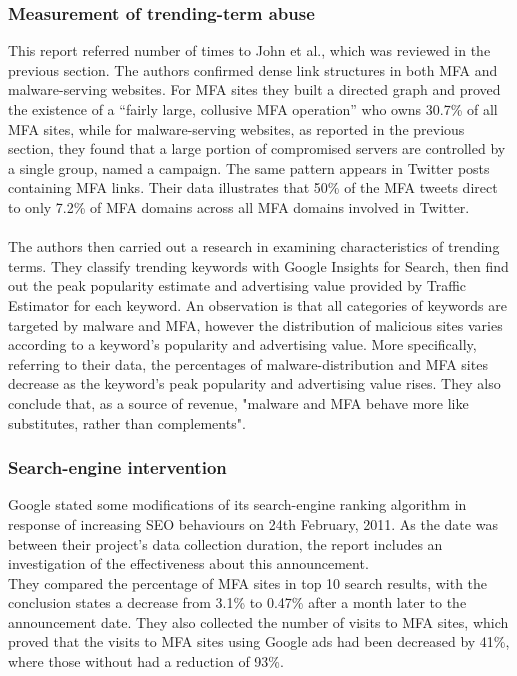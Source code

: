 \subsubsection{Measurement of trending-term abuse}
This report referred number of times to John et al.\cite{deseo}, which was 
reviewed in the previous section. The authors confirmed dense link structures in 
both MFA and malware-serving websites. For MFA sites they built a directed 
graph and proved the existence of a ``fairly large, collusive MFA operation'' 
who owns 30.7\% of all MFA sites, while for malware-serving websites, as 
reported in the previous section, they found that a large portion of 
compromised servers are controlled by a single group, named a campaign. The 
same pattern appears in Twitter posts containing MFA links. Their data 
illustrates that 50\% of the MFA tweets direct to only 7.2\% of MFA domains 
across all MFA domains involved in Twitter. 
\paragraph{}
The authors then carried out a research in examining characteristics of 
trending terms. They classify trending keywords with Google Insights for 
Search, then find out the peak popularity estimate and advertising value 
provided by Traffic Estimator for each keyword. An observation is that all 
categories of keywords are targeted by malware and MFA, however the 
distribution of malicious sites varies according to a keyword's popularity and 
advertising value. More specifically, referring to their data, the percentages 
of malware-distribution and MFA sites decrease as the keyword's peak 
popularity and advertising value rises. They also conclude that, as a source 
of revenue, "malware and MFA behave more like substitutes, rather than 
complements".\cite{moore2011fashion}
\subsubsection{Search-engine intervention}
Google stated some modifications of its search-engine ranking algorithm in 
response of increasing SEO behaviours on 24th February, 2011. As the date was 
between their project's data collection duration, the report includes an 
investigation of the effectiveness about this announcement. \\
They compared the percentage of MFA sites in top 10 search results, with the 
conclusion states a decrease from 3.1\% to 0.47\% after a month later to the 
announcement date. They also collected the number of visits to MFA sites, 
which proved that the visits to MFA sites using Google ads had been decreased 
by 41\%, where those without had a reduction of 93\%. 
